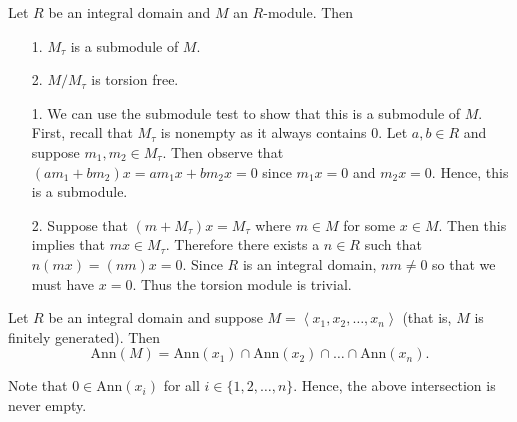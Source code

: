 \documentclass[12pt,letterpaper]{algebra_book}
\newcommand{\ann}{\mbox{Ann}}
\theoremstyle{definition}
\begin{document}
\begin{proposition}
    Let $R$ be an integral domain and $M$ an $R$-module. Then 
    \begin{itemize}
        \item[1.] $M_\tau$ is a submodule of $M$. 
        \item[2.] $M/M_\tau$ is torsion free. 
    \end{itemize}
\end{proposition}

\begin{prf}
    \begin{itemize}
        \item[1.] We can use the submodule test to show that this
        is a submodule of $M$. First, recall that $M_\tau$ is
        nonempty as it always contains 0. Let $a, b \in R$ and suppose $m_1,
        m_2 \in M_\tau$. Then observe that $(am_1 + bm_2)x = am_1x
        + bm_2x = 0$ since $m_1x = 0$ and $m_2x = 0$. Hence, this
        is a submodule.

        \item[2.] Suppose that $(m + M_\tau)x = M_\tau$ where $m
        \in M$ for some $x \in M$. 
        Then this implies that $mx \in M_\tau$. Therefore there
        exists a $n \in R$ such that $n(mx) = (nm)x = 0$. Since
        $R$ is an integral domain, $nm \ne 0$ so that we must have
        $x = 0$. Thus the torsion module is trivial.
    \end{itemize}
\end{prf}

\begin{proposition}
    Let $R$ be an integral domain and suppose $M = \left< x_1,x_2,
    \dots, x_n \right>$ (that is, $M$ is finitely generated). Then 
    \[
        \ann(M) = \ann(x_1) \cap \ann(x_2) \cap \dots \cap \ann(x_n).
    \] 
\end{proposition}
Note that $0 \in \ann(x_i)$ for all $i \in \{1, 2, \dots, n\}$.
Hence, the above intersection is never empty. 
\end{document}
